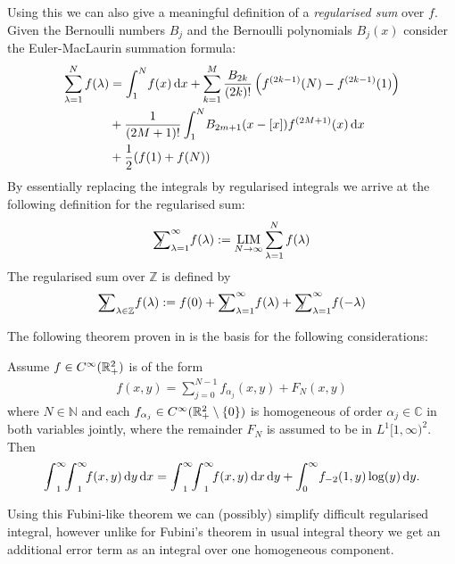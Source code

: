 Using this we can also give a meaningful definition of a \emph{regularised sum}
over $f$. Given the Bernoulli numbers $B_j$ and the Bernoulli polynomials
$B_j(x)$ consider the Euler-MacLaurin summation formula:
\begin{align*}
  \sum_{\lambda=1}^N f(\lambda) &= \Integ[N]{1}{x}{f(x)}
  + \sum_{k=1}^M \frac{B_{2k}}{(2k)!}\left(f^{(2k-1)}(N) - f^{(2k-1)}(1)\right)
  \\
  &\mathbin{+} \frac1{(2M + 1)!}\Integ[N]{1}{x}{B_{2m+1}(x-[x])f^{(2M+1)}(x)}
  \\
  &\mathbin{+} \frac12(f(1)+f(N))
\end{align*}
By essentially replacing the integrals by regularised integrals we arrive at the
following definition for the regularised sum:
\begin{align*}
  \Regsum_{\lambda=1}^\infty f(\lambda) := \Reglim_{N\to\infty} \sum_{\lambda=1}^N
  f(\lambda)
\end{align*}
The regularised sum over $\mathbb{Z}$ is defined by
\begin{align*}
  \Regsum_{\lambda\in\mathbb{Z}} f(\lambda) := f(0) + \Regsum_{\lambda=1}^\infty
  f(\lambda) + \Regsum_{\lambda=1}^\infty f(-\lambda)
\end{align*}

The following theorem proven in \cite{LV13} is the basis for the following
considerations:
\begin{Theorem}
  \label{thm:fubini}
  Assume $f\in\Cinf(\Rplus[2])$ is of the form
  \begin{align*}
    f(x,y) = \sum_{j=0}^{N-1} f_{\alpha_j}(x,y) + F_N(x,y)
  \end{align*}
  where $N\in\mathbb{N}$ and each $f_{\alpha_j}\in\Cinf(\mathbb{R}_+^2\setminus\{0\})$
  is homogeneous of order $\alpha_j\in\mathbb{C}$ in both variables jointly,
  where the remainder $F_N$ is assumed to be in $L^1[1,\infty)^2$. Then
  \begin{align}
    \Regint{x}{\Regint{y}{f(x,y)}} =
    \Regint{y}{\Regint{x}{f(x,y)}} + \Integ[\infty]{0}{y}{f_{-2}(1,y)\log(y)}.
  \end{align}
\end{Theorem}
Using this Fubini-like theorem we can (possibly) simplify difficult regularised
integral, however unlike for Fubini's theorem in usual integral theory we get an
additional error term as an integral over one homogeneous component. 

